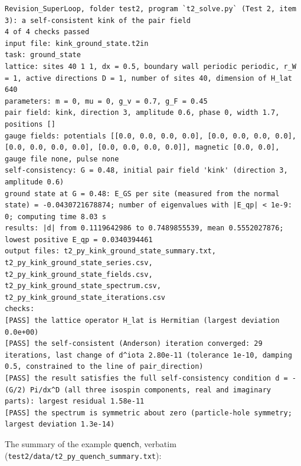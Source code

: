 \documentclass[
  10pt,
]{article}
\begin{document}
\begin{verbatim}
Revision_SuperLoop, folder test2, program `t2_solve.py` (Test 2, item 3): a self-consistent kink of the pair field
4 of 4 checks passed
input file: kink_ground_state.t2in
task: ground_state
lattice: sites 40 1 1, dx = 0.5, boundary wall periodic periodic, r_W = 1, active directions D = 1, number of sites 40, dimension of H_lat 640
parameters: m = 0, mu = 0, g_v = 0.7, g_F = 0.45
pair field: kink, direction 3, amplitude 0.6, phase 0, width 1.7, positions []
gauge fields: potentials [[0.0, 0.0, 0.0, 0.0], [0.0, 0.0, 0.0, 0.0], [0.0, 0.0, 0.0, 0.0], [0.0, 0.0, 0.0, 0.0]], magnetic [0.0, 0.0], gauge file none, pulse none
self-consistency: G = 0.48, initial pair field 'kink' (direction 3, amplitude 0.6)
ground state at G = 0.48: E_GS per site (measured from the normal state) = -0.0430721678874; number of eigenvalues with |E_qp| < 1e-9: 0; computing time 8.03 s
results: |d| from 0.1119642986 to 0.7489855539, mean 0.5552027876; lowest positive E_qp = 0.0340394461
output files: t2_py_kink_ground_state_summary.txt, t2_py_kink_ground_state_series.csv, t2_py_kink_ground_state_fields.csv, t2_py_kink_ground_state_spectrum.csv, t2_py_kink_ground_state_iterations.csv
checks:
[PASS] the lattice operator H_lat is Hermitian (largest deviation 0.0e+00)
[PASS] the self-consistent (Anderson) iteration converged: 29 iterations, last change of d^iota 2.80e-11 (tolerance 1e-10, damping 0.5, constrained to the line of pair_direction)
[PASS] the result satisfies the full self-consistency condition d = -(G/2) Pi/dx^D (all three isospin components, real and imaginary parts): largest residual 1.58e-11
[PASS] the spectrum is symmetric about zero (particle-hole symmetry; largest deviation 1.3e-14)
\end{verbatim}

The summary of the example \texttt{quench}, verbatim
(\texttt{test2/data/t2\_py\_quench\_summary.txt}):
\end{document}
